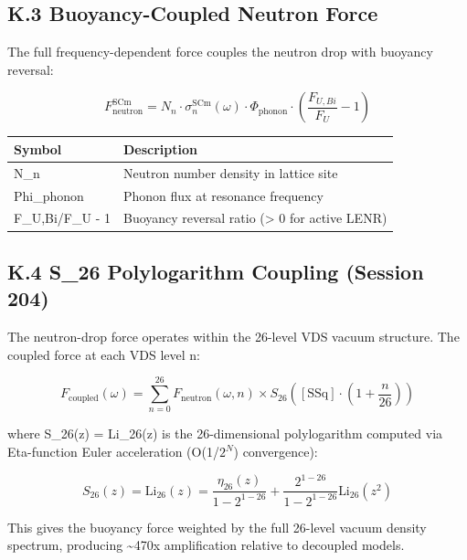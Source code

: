 \documentclass[12pt,a4paper]{article}
\begin{document}
\subsection{K.3 Buoyancy-Coupled Neutron Force}

The full frequency-dependent force couples the neutron drop with buoyancy reversal:

\begin{equation}
F_{\mathrm{neutron}}^{\mathrm{SCm}} = N_n \cdot \sigma_n^{\mathrm{SCm}}(\omega) \cdot \Phi_{\mathrm{phonon}} \cdot \left(\frac{F_{U,Bi}}{F_U} - 1\right)
\end{equation}

\begin{table}[H]
\centering
\small
\begin{tabularx}{\linewidth}{@{}>{\raggedright\arraybackslash}X>{\raggedright\arraybackslash}X@{}}
\toprule
Symbol & Description \tabularnewline
\midrule
N\_n & Neutron number density in lattice site \tabularnewline
Phi\_phonon & Phonon flux at resonance frequency \tabularnewline
F\_{U,Bi}/F\_U - 1 & Buoyancy reversal ratio (> 0 for active LENR) \tabularnewline
\bottomrule
\end{tabularx}
\end{table}

\subsection{K.4 S\_26 Polylogarithm Coupling (Session 204)}

The neutron-drop force operates within the 26-level VDS vacuum structure. The coupled force at each VDS level n:

\begin{equation}
F_{\mathrm{coupled}}(\omega) = \sum_{n=0}^{26} F_{\mathrm{neutron}}(\omega, n) \times S_{26}\!\left([\text{SSq}] \cdot \left(1 + \frac{n}{26}\right)\right)
\end{equation}

where S\_26(z) = Li\_26(z) is the 26-dimensional polylogarithm computed via Eta-function Euler acceleration (O(1/$2^{N}$) convergence):

\begin{equation}
S_{26}(z) = \text{Li}_{26}(z) = \frac{\eta_{26}(z)}{1 - 2^{1-26}} + \frac{2^{1-26}}{1 - 2^{1-26}} \text{Li}_{26}(z^2)
\end{equation}

This gives the buoyancy force weighted by the full 26-level vacuum density spectrum, producing \textasciitilde{}470x amplification relative to decoupled models.
\end{document}
